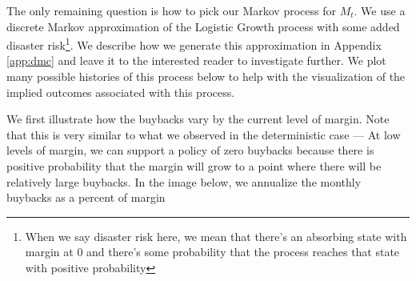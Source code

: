 The only remaining question is how to pick our Markov process for $M_t$. We use a discrete Markov
approximation of the Logistic Growth process with some added disaster risk\footnote{When we say
disaster risk here, we mean that there's an absorbing state with margin at 0 and there's some
probability that the process reaches that state with positive probability}. We describe how we
generate this approximation in Appendix \ref{app:dmc} and leave it to the interested reader to
investigate further. We plot many possible histories of this process below to help with the
visualization of the implied outcomes associated with this process.

\begin{center}
  \begin{figure}[H]
    \label{fig:sm_stochastic_margin_growth}
  \end{figure}
\end{center}

We first illustrate how the buybacks vary by the current level of margin. Note that this is very
similar to what we observed in the deterministic case --- At low levels of margin, we can support
a policy of zero buybacks because there is positive probability that the margin will grow to a point
where there will be relatively large buybacks. In the image below, we annualize the monthly buybacks
as a percent of margin

